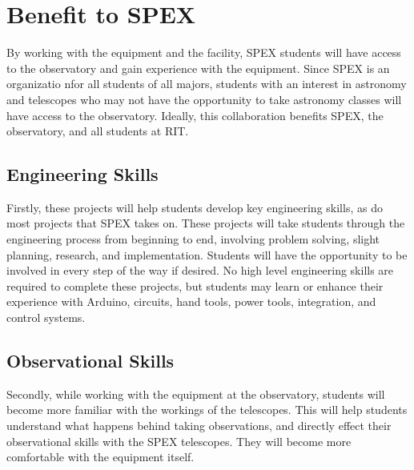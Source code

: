 \documentclass[conference]{IEEEtran} %
\begin{document}
\section{Benefit to SPEX}
\label{sec:benefit}

By working with the equipment and the facility, SPEX students will have access to the observatory and gain experience with the equipment.
Since SPEX is an organizatio nfor all students of all majors, students with an interest in astronomy and telescopes who may not have the opportunity to take astronomy classes will have access to the observatory.
Ideally, this collaboration benefits SPEX, the observatory, and all students at RIT.


\subsection{Engineering Skills}
\label{subsec:engineeringSkills}
Firstly, these projects will help students develop key engineering skills, as do most projects that SPEX takes on.
These projects will take students through the engineering process from beginning to end, involving problem solving, slight planning, research, and implementation.
Students will have the opportunity to be involved in every step of the way if desired.
No high level engineering skills are required to complete these projects, but students may learn or enhance their experience with Arduino, circuits, hand tools, power tools, integration, and control systems.

\subsection{Observational Skills}
\label{subsec:observationalSkills}
Secondly, while working with the equipment at the observatory, students will become more familiar with the workings of the telescopes.
This will help students understand what happens behind taking observations, and directly effect their observational skills with the SPEX telescopes.
They will become more comfortable with the equipment itself.
\end{document}
